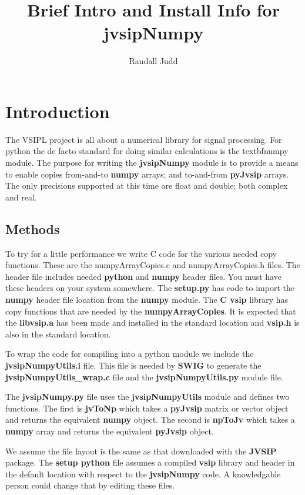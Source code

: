 \documentclass[11pt, oneside]{article}
\title{Brief Intro and Install Info for jvsipNumpy}
\author{Randall Judd}
\newcommand{\ttbf}[1]{{\ttfamily \bfseries #1}}
\begin{document}
\maketitle
 \section*{Introduction}
 The VSIPL project is all about a numerical library for signal processing. For python
the de facto standard for doing similar calculations is the textbf{numpy} module. The purpose
for writing the \textbf{jvsipNumpy} module is to provide a means to enable copies from-and-to
\textbf{numpy} arrays; and to-and-from \textbf{pyJvsip} arrays. The only precisions supported at this
time are float and double; both complex and real.
\subsection*{Methods}
To try for a little performance we write C code for the various needed copy functions.
These are the numpyArrayCopies.c and numpyArrayCopies.h files. The header file
includes needed \textbf{python} and \textbf{numpy} header files. You must have these headers on your
system somewhere.  The \textbf{setup.py} has code to import the \textbf{numpy} header file location from the \textbf{numpy} module.  The \textbf{C vsip} library has copy functions that are needed by the  \textbf{numpyArrayCopies}.  It is expected that the \textbf{libvsip.a} has been made and installed
in the standard location and \textbf{vsip.h} is also in the standard location.

To wrap the code for compiling into a python module we include the \textbf{jvsipNumpyUtils.i}
file. This file is needed by \textbf{SWIG} to generate the \textbf{jvsipNumpyUtils\_wrap.c} file and the
\textbf{jvsipNumpyUtils.py} module file.

The \textbf{jvsipNumpy.py} file uses the \textbf{jvsipNumpyUtils} module and defines two functions.
The first is  \ttbf{jvToNp} which takes a \textbf{pyJvsip} matrix or vector object and returns the
equivalent \textbf{numpy} object. The second is \ttbf{npToJv} which takes a \textbf{numpy} array and returns
the equivalent \textbf{pyJvsip} object.

We assume the file layout is the same as that downloaded with the \textbf{JVSIP} package. The \textbf{setup python} file assumes a compiled \textbf{vsip} library and header in the default location with respect to the \textbf{jvsipNumpy} code.  A knowledgable person could change that by editing these files.
\end{document}
